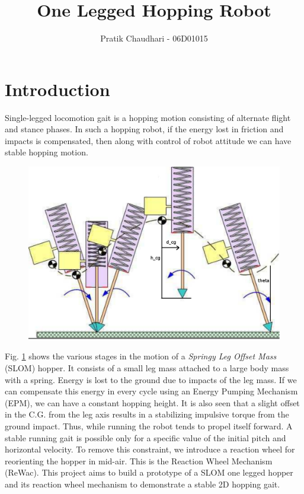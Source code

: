 \documentclass[10pt, compsocconf, conference]{IEEEtran}
\title{One Legged Hopping Robot}
\author{Pratik Chaudhari - 06D01015}
\begin{document}
\maketitle
\section{Introduction}
Single-legged locomotion gait is a hopping motion consisting of alternate flight and stance
phases. In such a hopping robot, if the energy lost in friction and impacts is compensated,
then along with control of robot attitude we can have stable hopping motion. 
\begin{figure}[h]
\centering
\includegraphics[scale = 0.8]{fig/slom_motion.pdf}
\label{schematic}
\end{figure}
Fig. \ref{schematic} shows the various stages in the motion of a \textit{Springy Leg Offset Mass} (SLOM) hopper. It consists
of a small leg mass attached to a large body mass with a spring. Energy is lost to the ground due to impacts of the
leg mass. If we can compensate this energy in every cycle using an Energy Pumping Mechanism (EPM), we can have a constant
hopping height. It is also seen that a
slight offset in the C.G. from the leg axis results in a stabilizing impulsive torque from the ground impact. Thus, while
running the robot tends to propel itself forward. 
A stable running gait is possible only for a specific value of the initial pitch and horizontal velocity. To remove this
constraint, we introduce
a reaction wheel for reorienting the hopper in mid-air. This is the Reaction Wheel Mechanism (ReWac). This project aims to build
a prototype of a SLOM one legged hopper and its reaction wheel mechanism to demonstrate a stable 2D hopping gait.\\
\end{document}
